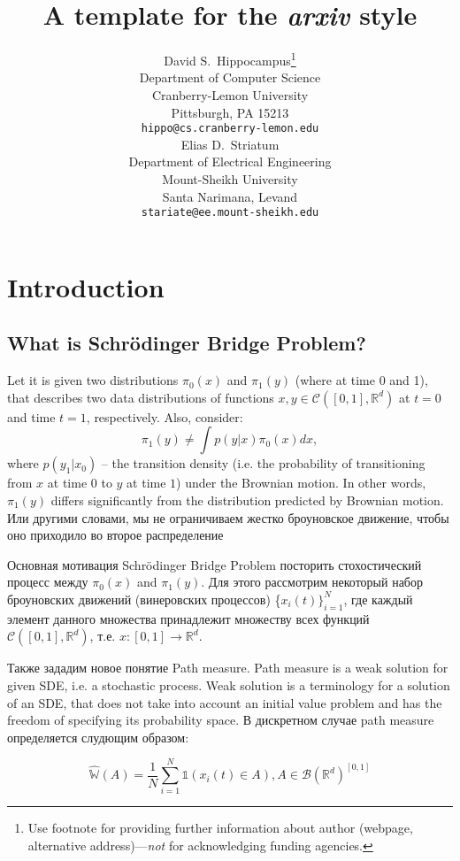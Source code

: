 \documentclass{article}
\title{A template for the \emph{arxiv} style}
\author{ David S.~Hippocampus\thanks{Use footnote for providing further
		information about author (webpage, alternative
		address)---\emph{not} for acknowledging funding agencies.} \\
	Department of Computer Science\\
	Cranberry-Lemon University\\
	Pittsburgh, PA 15213 \\
	\texttt{hippo@cs.cranberry-lemon.edu} \\
	\And
	Elias D.~Striatum \\
	Department of Electrical Engineering\\
	Mount-Sheikh University\\
	Santa Narimana, Levand \\
	\texttt{stariate@ee.mount-sheikh.edu} \\
}
\date{}
\begin{document}
\maketitle

\begin{abstract}
	\lipsum[1]
\end{abstract}



\section{Introduction}
\subsection{What is Schrödinger Bridge Problem?}
Let it is given two  distributions $\pi_0(x)$ and $\pi_1(y)$ (where at time 0 and 1), that describes two data distributions of  functions  $x, y\in\mathcal{C}([0,1], \mathbb{R}^d)$ at $t=0$ and time $t=1$, respectively. Also, consider:
$$\pi_1(y) \neq \int p(y|x)\pi_0(x)dx,$$
where $p(y_1|x_0)$ -- the transition density (i.e. the probability of transitioning from $x$ at time $0$ to $y$ at time $1$) under the Brownian motion. In other words, $\pi_1(y)$ differs significantly from the distribution predicted by Brownian motion. Или другими словами, мы не ограничиваем жестко броуновское движение, чтобы оно приходило во второе распределение \par 
Основная мотивация Schrödinger Bridge Problem посторить стохостический процесс между $\pi_0(x)$ and $\pi_1(y)$. Для этого рассмотрим некоторый набор броуновских движений (винеровских процессов) \{$x_i(t)\}^N_{i=1}$, где каждый элемент данного множества принадлежит множеству всех функций $\mathcal{C}([0,1], \mathbb{R}^d)$, т.е. $x:[0,1]\rightarrow \mathbb{R}^d$.\par 
Также зададим новое понятие Path measure. Path measure is a weak solution for given SDE, i.e. a stochastic process. Weak solution is a terminology for a solution of an SDE, that does not take into account an initial value problem and has the freedom of specifying its probability space. В дискретном случае path measure определяется слудющим образом:


\begin{equation} \label{eq1}   
    \hat{\mathbb{W}}(A)=\frac{1}{N}\sum_{i=1}^N\mathds{1}\left(x_i(t)\in A\right), A\in \mathcal{B}(\mathbb{R}^d)^{[0,1]}
\end{equation}
\end{document}
